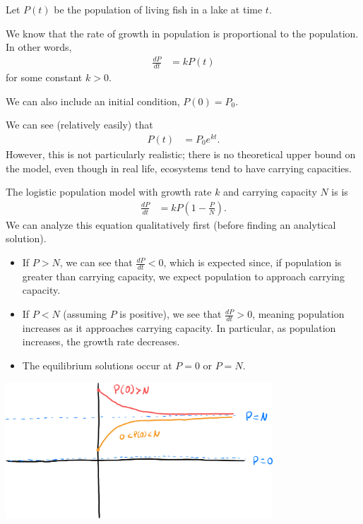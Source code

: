 \documentclass[10pt]{mypackage}
\begin{document}
  \begin{example}
    Let $P(t)$ be the population of living fish in a lake at time $t$.\newline

    We know that the rate of growth in population is proportional to the population. In other words,
    \begin{align*}
      \frac{dP}{dt} &= kP(t)
    \end{align*}
    for some constant $k > 0$.\newline

    We can also include an initial condition, $P(0) = P_0$.\newline

    We can see (relatively easily) that
    \begin{align*}
      P(t) &= P_0e^{kt}.
    \end{align*}
    However, this is not particularly realistic; there is no theoretical upper bound on the model, even though in real life, ecosystems tend to have carrying capacities.\newline

    The logistic population model with growth rate $k$ and carrying capacity $N$ is is
    \begin{align*}
      \frac{dP}{dt} &= kP\left(1 - \frac{P}{N}\right).
    \end{align*}
    We can analyze this equation qualitatively first (before finding an analytical solution).
    \begin{itemize}
      \item If $P > N$, we can see that $\frac{dP}{dt} < 0$, which is expected since, if population is greater than carrying capacity, we expect population to approach carrying capacity.
      \item If $P < N$ (assuming $P$ is positive), we see that $\frac{dP}{dt} > 0$, meaning population increases as it approaches carrying capacity. In particular, as population increases, the growth rate decreases.
      \item The equilibrium solutions occur at $P = 0$ or $P = N$.
    \end{itemize}
    \begin{center}
      \includegraphics[width=10cm]{images/logistic_map.png}
    \end{center}
  \end{example}
\end{document}
